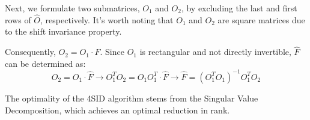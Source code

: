 \begin{enumerate}
        Next, we formulate two submatrices, $O_1$ and $O_2$, by excluding the last and first rows of $\hat{O}$, respectively. 
        It's worth noting that $O_1$ and $O_2$ are square matrices due to the shift invariance property.
        
        Consequently, $O_2=O_1\cdot \hat{F}$.
        Since $O_1$ is rectangular and not directly invertible, $\hat{F}$ can be determined as:
        \[O_2=O_1\cdot \hat{F} \rightarrow O_1^TO_2=O_1O_1^T\cdot \hat{F} \rightarrow \hat{F}=\left(O_1^TO_1\right)^{-1}O_1^TO_2\]
\end{enumerate}
\begin{property}
    The optimality of the 4SID algorithm stems from the Singular Value Decomposition, which achieves an optimal reduction in rank.
\end{property}